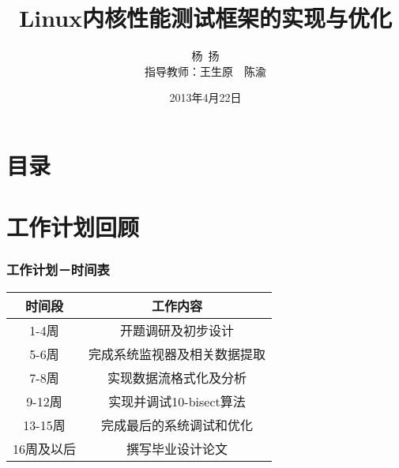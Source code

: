 \documentclass[xcolor=dvipsnames,11pt]{beamer}
\begin{document}
                                           

\title{Linux内核性能测试框架的实现与优化\\ {}}
\author[杨\ 扬]{杨\ 扬\\指导教师：王生原\ \ 陈渝}

\date{2013年4月22日}


\frame{\titlepage}

\section*{目录}                                %
\frame {
          \tableofcontents      %
}


\section{工作计划回顾}
\begin{frame}
\frametitle{工作计划－时间表}
{
\center
\begin{tabular}{c||c}
时间段 & 工作内容\\
\hline
1-4周 & 开题调研及初步设计\\
\hline
5-6周 & 完成系统监视器及相关数据提取\\
\hline
7-8周 & 实现数据流格式化及分析\\
\hline
9-12周 & 实现并调试10-bisect算法\\
\hline
13-15周 & 完成最后的系统调试和优化\\ 
\hline
16周及以后 & 撰写毕业设计论文
\end{tabular}

}
\end{frame}

\iffalse
\begin{frame}
\frametitle{开题时已有进展}
已有的进展是：
\begin{enumerate}
\item Intel工程师吴峰光初步完成了前期框架
\item 完成部分系统监视器的编写(60\%)
\item 完成部分系统监视器输出的分析脚本(40\%)
\item 初步了解了总体框架的运行机制
\end{enumerate}
\end{frame}
\fi
\end{document}
